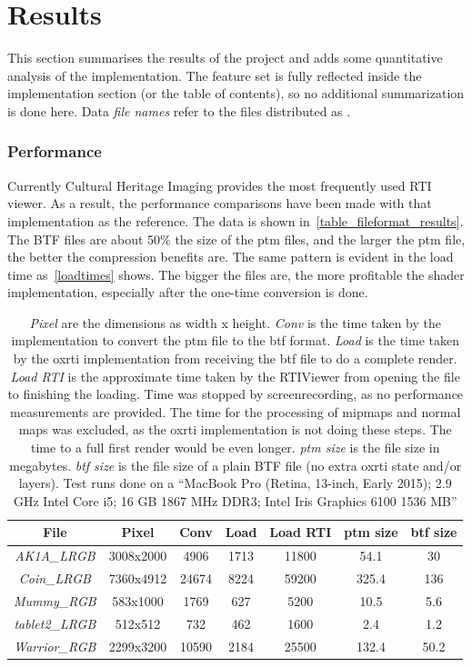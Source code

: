 \section{Results}
This section summarises the results of the project and adds some quantitative
analysis of the implementation. The feature set is fully reflected inside the
implementation section (or the table of contents), so no additional
summarization is done here. Data \emph{file names} refer to the files distributed as \cite*{goslar_oxrti_data:_2018}.

\subsubsection{Performance}
Currently Cultural Heritage Imaging provides the most frequently used RTI viewer\cite*{noauthor_cultural_nodate-1}. As a result, the performance comparisons have been made with that implementation as the reference. The data is shown
in~\autoref{table_fileformat_results}. The BTF files are about 50\% the size of
the ptm files, and the larger the ptm file, the better the compression benefits are.
The same pattern is evident in the load time as~\autoref{loadtimes} shows. The
bigger the files are, the more profitable the shader implementation, especially
after the one-time conversion is done.

\begin{table}[H]
\begin{tabular}{|c |  c c c c c c|}
 \hline
 File & Pixel & Conv & Load & Load RTI & ptm size & btf size\\
  \hline
  \emph{AK1A\_LRGB} & 3008x2000 & 4906 & 1713 & 11800 & 54.1 & 30  \\
  \emph{Coin\_LRGB} & 7360x4912 & 24674 & 8224 & 59200 & 325.4 & 136  \\
  \emph{Mummy\_RGB} & 583x1000 & 1769 & 627 & 5200 & 10.5 & 5.6  \\
  \emph{tablet2\_LRGB} & 512x512 & 732 & 462 & 1600 & 2.4 & 1.2  \\
  \emph{Warrior\_RGB} & 2299x3200 & 10590 & 2184 & 25500 & 132.4 & 50.2  \\
 \hline
\end{tabular}
\caption[Performance Comparison]{\emph{Pixel} are the dimensions as width x height. \emph{Conv} is the time taken
by the implementation to convert the ptm file to the btf format. \emph{Load} is
the time taken by the oxrti implementation from receiving the btf file to do a complete render. \emph{Load
  RTI} is the approximate time taken by the RTIViewer from opening the file to
finishing the loading. Time was stopped by screenrecording, as no performance
measurements are provided. The time for the processing of mipmaps and normal
maps was excluded, as the oxrti implementation is not doing these steps. The
time to a full first render would be even longer. \emph{ptm size} is the file size in
megabytes. \emph{btf size} is the file size of a plain BTF file (no extra oxrti
state and/or layers). Test runs done on a ``MacBook Pro (Retina, 13-inch, Early
2015); 2.9 GHz Intel Core i5; 16 GB 1867 MHz DDR3; Intel Iris Graphics 6100 1536 MB'' }
\label{table_fileformat_results}
\end{table}

